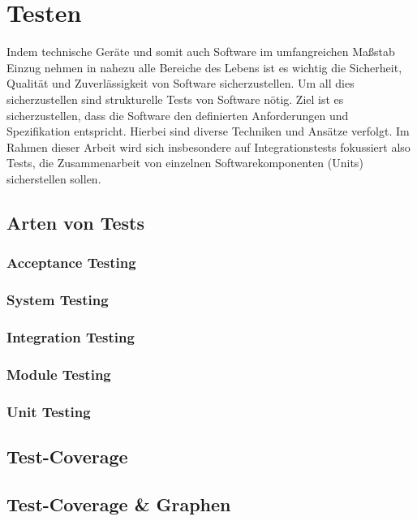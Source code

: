 \section{Testen}

Indem technische Geräte und somit auch Software im umfangreichen Maßstab Einzug nehmen in nahezu alle Bereiche des
Lebens ist es wichtig die Sicherheit, Qualität und Zuverlässigkeit von Software sicherzustellen.
Um all dies sicherzustellen sind strukturelle Tests von Software nötig.
Ziel ist es sicherzustellen, dass die Software den definierten Anforderungen und Spezifikation entspricht.
Hierbei sind diverse Techniken und Ansätze verfolgt.
Im Rahmen dieser Arbeit wird sich insbesondere auf Integrationstests fokussiert also Tests, die Zusammenarbeit von einzelnen Softwarekomponenten (Units)
sicherstellen sollen.

\subsection{Arten von Tests}

\subsubsection{Acceptance Testing}

\subsubsection{System Testing}

\subsubsection{Integration Testing}

\subsubsection{Module Testing}

\subsubsection{Unit Testing}

\subsection{Test-Coverage}

\subsection{Test-Coverage & Graphen}

